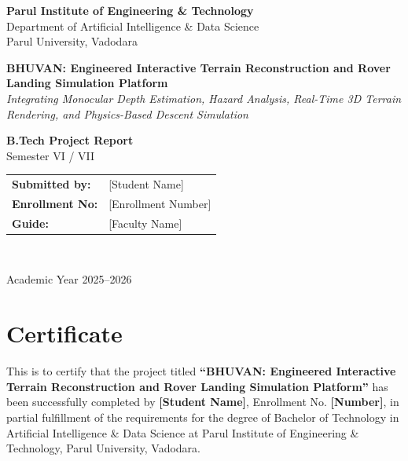 \documentclass[12pt,a4paper]{report}
\begin{document}
\begin{titlepage}
\centering
\vspace*{1cm}
{\Large\textbf{Parul Institute of Engineering \& Technology}}\\\vspace{0.3cm}
{\large Department of Artificial Intelligence \& Data Science}\\\vspace{0.3cm}
{\large Parul University, Vadodara}\\\vspace{1.5cm}


{\LARGE\textbf{BHUVAN: Engineered Interactive Terrain Reconstruction and Rover Landing Simulation Platform}}\\\vspace{0.5cm}
{\large\textit{Integrating Monocular Depth Estimation, Hazard Analysis, Real-Time 3D Terrain Rendering, and Physics-Based Descent Simulation}}\\\vspace{1.5cm}

{\large\textbf{B.Tech Project Report}}\\\vspace{0.3cm}
{\large Semester VI / VII}\\\vspace{1.5cm}

\begin{tabular}{ll}
\textbf{Submitted by:} & [Student Name] \\
\textbf{Enrollment No:} & [Enrollment Number] \\
\textbf{Guide:} & [Faculty Name] \\
\end{tabular}\\\vspace{2cm}

{\large Academic Year 2025--2026}
\end{titlepage}

\chapter*{Certificate}
This is to certify that the project titled \textbf{``BHUVAN: Engineered Interactive Terrain Reconstruction and Rover Landing Simulation Platform''} has been successfully completed by \textbf{[Student Name]}, Enrollment No. \textbf{[Number]}, in partial fulfillment of the requirements for the degree of Bachelor of Technology in Artificial Intelligence \& Data Science at Parul Institute of Engineering \& Technology, Parul University, Vadodara.
\end{document}
